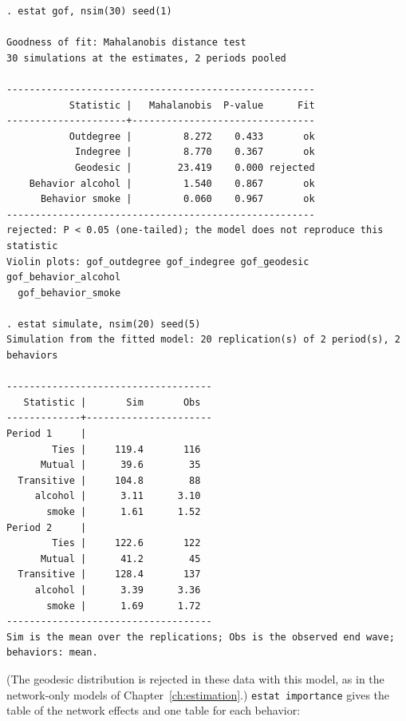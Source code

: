 \begin{lstlisting}
. estat gof, nsim(30) seed(1)

Goodness of fit: Mahalanobis distance test
30 simulations at the estimates, 2 periods pooled

------------------------------------------------------
           Statistic |   Mahalanobis  P-value      Fit
---------------------+--------------------------------
           Outdegree |         8.272    0.433       ok
            Indegree |         8.770    0.367       ok
            Geodesic |        23.419    0.000 rejected
    Behavior alcohol |         1.540    0.867       ok
      Behavior smoke |         0.060    0.967       ok
------------------------------------------------------
rejected: P < 0.05 (one-tailed); the model does not reproduce this statistic
Violin plots: gof_outdegree gof_indegree gof_geodesic gof_behavior_alcohol
  gof_behavior_smoke

. estat simulate, nsim(20) seed(5)
Simulation from the fitted model: 20 replication(s) of 2 period(s), 2 behaviors

------------------------------------
   Statistic |       Sim       Obs
-------------+----------------------
Period 1     |
        Ties |     119.4       116
      Mutual |      39.6        35
  Transitive |     104.8        88
     alcohol |      3.11      3.10
       smoke |      1.61      1.52
Period 2     |
        Ties |     122.6       122
      Mutual |      41.2        45
  Transitive |     128.4       137
     alcohol |      3.39      3.36
       smoke |      1.69      1.72
------------------------------------
Sim is the mean over the replications; Obs is the observed end wave; behaviors: mean.
\end{lstlisting}
(The geodesic distribution is rejected in these data with this model, as in the network-only models of Chapter~\ref{ch:estimation}.) \texttt{estat importance} gives the table of the network effects and one table for each behavior:
